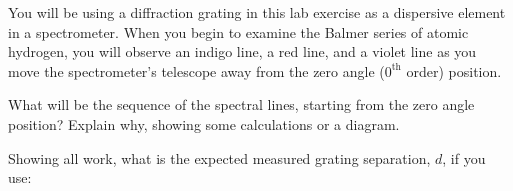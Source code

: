 \documentclass[addpoints]{physlabs}
\date{\today}
\begin{document}
\maketitle

\begin{prelab}

    \question[1] You will be using a diffraction grating in this lab exercise as a dispersive element in a spectrometer. When you begin to examine the Balmer series of atomic hydrogen, you will observe an indigo line, a red line, and a violet line as you move the spectrometer's telescope away from the zero angle ($0^\text{th}$ order) position.
    
    What will be the sequence of the spectral lines, starting from the zero angle position? Explain why, showing some calculations or a diagram.
    \begin{solution}[8cm]
        
    \end{solution}

    \question Showing all work, what is the expected measured grating separation, $d$, if you use:
    
\end{prelab}
\end{document}
